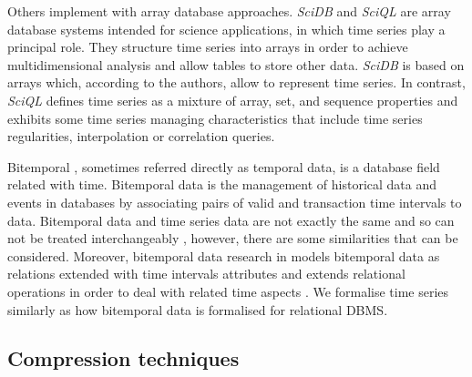  
Others implement  with array database approaches.
\emph{SciDB} \cite{stonebraker09:scidb} and \emph{SciQL}
\cite{zhang11} are array database systems intended for science
applications, in which time series play a principal role. They
structure time series into arrays in order to achieve multidimensional
analysis and allow tables to store other data.  \emph{SciDB} is based
on arrays which, according to the authors, allow to represent time
series.  In contrast, \emph{SciQL} defines time
series as a mixture of array, set, and sequence properties and
exhibits some time series managing characteristics that include time
series regularities, interpolation or correlation queries.  





Bitemporal , sometimes referred directly as temporal data,
is a database field related with time. Bitemporal data is the
management of historical data and events in databases by associating
pairs of valid and transaction time intervals to data.  Bitemporal
data and time series data are not exactly the same and so can not be
treated interchangeably \cite{schmidt95}, however, there are some
similarities that can be considered. Moreover, bitemporal data
research in  models bitemporal data as relations extended
with time intervals attributes and extends relational operations in
order to deal with related time aspects
\cite{jensen99:temporaldata,date02:_tempor_data_relat_model}.
We formalise time series similarly as how bitemporal data
is formalised for relational DBMS.



\subsection{Compression techniques}





